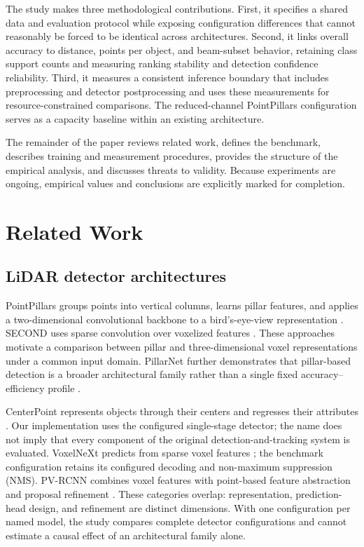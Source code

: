 \documentclass[10pt,twocolumn]{article}
\begin{document}
The study makes three methodological contributions. First, it specifies a shared data and evaluation protocol while exposing configuration differences that cannot reasonably be forced to be identical across architectures. Second, it links overall accuracy to distance, points per object, and beam-subset behavior, retaining class support counts and measuring ranking stability and detection confidence reliability. Third, it measures a consistent inference boundary that includes preprocessing and detector postprocessing and uses these measurements for resource-constrained comparisons. The reduced-channel PointPillars configuration serves as a capacity baseline within an existing architecture.

The remainder of the paper reviews related work, defines the benchmark, describes training and measurement procedures, provides the structure of the empirical analysis, and discusses threats to validity. Because experiments are ongoing, empirical values and conclusions are explicitly marked for completion.

\section{Related Work}
\subsection{LiDAR detector architectures}
PointPillars groups points into vertical columns, learns pillar features, and applies a two-dimensional convolutional backbone to a bird's-eye-view representation \cite{lang2019pointpillars}. SECOND uses sparse convolution over voxelized features \cite{yan2018second}. These approaches motivate a comparison between pillar and three-dimensional voxel representations under a common input domain. PillarNet further demonstrates that pillar-based detection is a broader architectural family rather than a single fixed accuracy--efficiency profile \cite{shi2022pillarnet}.

CenterPoint represents objects through their centers and regresses their attributes \cite{yin2021centerpoint}. Our implementation uses the configured single-stage detector; the name does not imply that every component of the original detection-and-tracking system is evaluated. VoxelNeXt predicts from sparse voxel features \cite{chen2023voxelnext}; the benchmark configuration retains its configured decoding and non-maximum suppression (NMS). PV-RCNN combines voxel features with point-based feature abstraction and proposal refinement \cite{shi2020pvrcnn}. These categories overlap: representation, prediction-head design, and refinement are distinct dimensions. With one configuration per named model, the study compares complete detector configurations and cannot estimate a causal effect of an architectural family alone.
\end{document}
